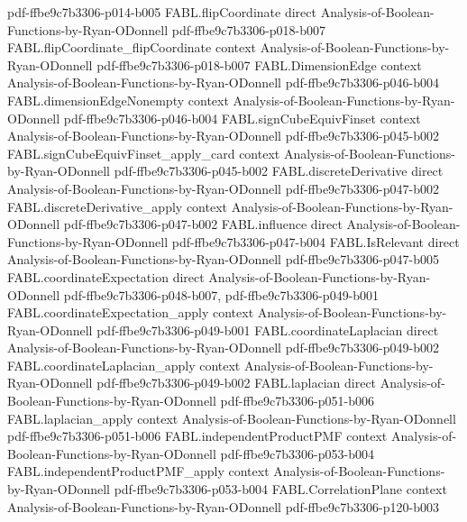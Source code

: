 \begin{theorem}
  {pdf-ffbe9c7b3306-p014-b005}
\proofstep
  {FABL.flipCoordinate}
  {direct}
  {Analysis-of-Boolean-Functions-by-Ryan-ODonnell}
  {pdf-ffbe9c7b3306-p018-b007}
\proofstep
  {FABL.flipCoordinate_flipCoordinate}
  {context}
  {Analysis-of-Boolean-Functions-by-Ryan-ODonnell}
  {pdf-ffbe9c7b3306-p018-b007}
\proofstep
  {FABL.DimensionEdge}
  {context}
  {Analysis-of-Boolean-Functions-by-Ryan-ODonnell}
  {pdf-ffbe9c7b3306-p046-b004}
\proofstep
  {FABL.dimensionEdgeNonempty}
  {context}
  {Analysis-of-Boolean-Functions-by-Ryan-ODonnell}
  {pdf-ffbe9c7b3306-p046-b004}
\proofstep
  {FABL.signCubeEquivFinset}
  {context}
  {Analysis-of-Boolean-Functions-by-Ryan-ODonnell}
  {pdf-ffbe9c7b3306-p045-b002}
\proofstep
  {FABL.signCubeEquivFinset_apply_card}
  {context}
  {Analysis-of-Boolean-Functions-by-Ryan-ODonnell}
  {pdf-ffbe9c7b3306-p045-b002}
\proofstep
  {FABL.discreteDerivative}
  {direct}
  {Analysis-of-Boolean-Functions-by-Ryan-ODonnell}
  {pdf-ffbe9c7b3306-p047-b002}
\proofstep
  {FABL.discreteDerivative_apply}
  {context}
  {Analysis-of-Boolean-Functions-by-Ryan-ODonnell}
  {pdf-ffbe9c7b3306-p047-b002}
\proofstep
  {FABL.influence}
  {direct}
  {Analysis-of-Boolean-Functions-by-Ryan-ODonnell}
  {pdf-ffbe9c7b3306-p047-b004}
\proofstep
  {FABL.IsRelevant}
  {direct}
  {Analysis-of-Boolean-Functions-by-Ryan-ODonnell}
  {pdf-ffbe9c7b3306-p047-b005}
\proofstep
  {FABL.coordinateExpectation}
  {direct}
  {Analysis-of-Boolean-Functions-by-Ryan-ODonnell}
  {pdf-ffbe9c7b3306-p048-b007,
    pdf-ffbe9c7b3306-p049-b001}
\proofstep
  {FABL.coordinateExpectation_apply}
  {context}
  {Analysis-of-Boolean-Functions-by-Ryan-ODonnell}
  {pdf-ffbe9c7b3306-p049-b001}
\proofstep
  {FABL.coordinateLaplacian}
  {direct}
  {Analysis-of-Boolean-Functions-by-Ryan-ODonnell}
  {pdf-ffbe9c7b3306-p049-b002}
\proofstep
  {FABL.coordinateLaplacian_apply}
  {context}
  {Analysis-of-Boolean-Functions-by-Ryan-ODonnell}
  {pdf-ffbe9c7b3306-p049-b002}
\proofstep
  {FABL.laplacian}
  {direct}
  {Analysis-of-Boolean-Functions-by-Ryan-ODonnell}
  {pdf-ffbe9c7b3306-p051-b006}
\proofstep
  {FABL.laplacian_apply}
  {context}
  {Analysis-of-Boolean-Functions-by-Ryan-ODonnell}
  {pdf-ffbe9c7b3306-p051-b006}
\proofstep
  {FABL.independentProductPMF}
  {context}
  {Analysis-of-Boolean-Functions-by-Ryan-ODonnell}
  {pdf-ffbe9c7b3306-p053-b004}
\proofstep
  {FABL.independentProductPMF_apply}
  {context}
  {Analysis-of-Boolean-Functions-by-Ryan-ODonnell}
  {pdf-ffbe9c7b3306-p053-b004}
\proofstep
  {FABL.CorrelationPlane}
  {context}
  {Analysis-of-Boolean-Functions-by-Ryan-ODonnell}
  {pdf-ffbe9c7b3306-p120-b003}

\end{theorem}
